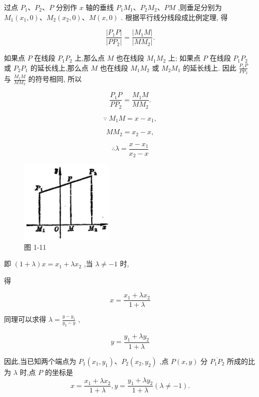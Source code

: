 \documentclass[lang=cn,newtx,10pt,scheme=chinese]{elegantbook}
\begin{document}
过点 \({P}_{1}\text{、}{P}_{2}\text{、}P\) 分别作 \(x\) 轴的垂线 \({P}_{1}{M}_{1}\text{、}{P}_{2}{M}_{2}\text{、}{PM}\) ,则垂足分别为 \({M}_{1}\left( {{x}_{1},0}\right) \text{、}{M}_{2}\left( {{x}_{2},0}\right) \text{、}M\left( {x,0}\right)\) . 根据平行线分线段成比例定理, 得

\[
  \frac{\left| {P}_{1}P\right| }{\left| P{P}_{2}\right| } = \frac{\left| {M}_{1}M\right| }{\left| M{M}_{2}\right| }.
\]

如果点 \(P\) 在线段 \({P}_{1}{P}_{2}\) 上,那么点 \(M\) 也在线段 \({M}_{1}{M}_{2}\) 上; 如果点 \(P\) 在线段 \({P}_{1}{P}_{2}\) 或 \({P}_{2}{P}_{1}\) 的延长线上,那么点 \(M\) 也在线段 \({M}_{1}{M}_{2}\) 或 \({M}_{2}{M}_{1}\) 的延长线上. 因此 \(\frac{{P}_{1}P}{P{P}_{2}}\) 与 \(\frac{{M}_{1}M}{M{M}_{2}}\) 的符号相同, 所以

\[
  \frac{{P}_{1}P}{P{P}_{2}} = \frac{{M}_{1}M}{M{M}_{2}}.
\]

\[
  \because \;{M}_{1}M = x - {x}_{1},
\]

\[
  M{M}_{2} = {x}_{2} - x,
\]

\[
  \therefore \lambda = \frac{x - {x}_{1}}{{x}_{2} - x}
\]

\begin{figure}[h]
  \centering
  \includegraphics[max width=0.4\textwidth]{images/01912cc2-ffb6-728e-9ae7-b113ff05c64b_13_700827.jpg}
  \caption{图 1-11}
\end{figure}



即 \(\left( {1 + \lambda }\right) x = {x}_{1} + \lambda {x}_{2}\) ,当 \(\lambda \neq - 1\) 时,

得

\[
  x = \frac{{x}_{1} + \lambda {x}_{2}}{1 + \lambda }
\]

同理可以求得 \(\lambda = \frac{y - {y}_{1}}{{y}_{2} - y}\) ,

\[
  y = \frac{{y}_{1} + \lambda {y}_{2}}{1 + \lambda }
\]


\begin{corollary}[定比分点的坐标]
	
因此,当已知两个端点为 \({P}_{1}\left( {{x}_{1},{y}_{1}}\right) \text{、}{P}_{2}\left( {{x}_{2},{y}_{2}}\right)\) ,点 \(P\left( {x,y}\right)\) 分 \(\overline{{P}_{1}{P}_{2}}\) 所成的比为 \(\lambda\) 时,点 \(P\) 的坐标是
\[
  x = \frac{{x}_{1} + \lambda {x}_{2}}{1 + \lambda },y = \frac{{y}_{1} + \lambda {y}_{2}}{1 + \lambda }\left( {\lambda \neq - 1}\right) .
\]
\end{corollary}
\end{document}
